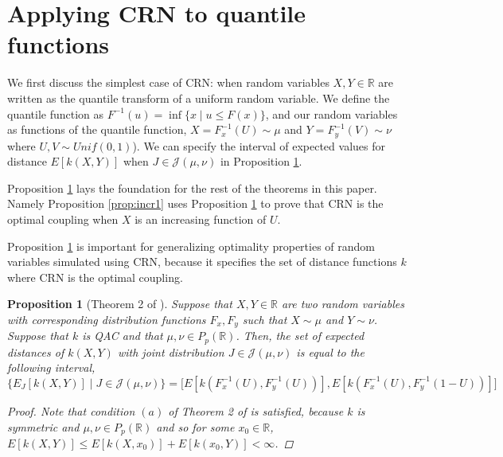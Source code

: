 \documentclass[12pt]{article}
\theoremstyle{plain}%
\newtheorem{prop}[theorem]{Proposition}
\theoremstyle{definition}
\begin{document}
%


\section{Applying CRN to quantile functions}\label{sec:invdf}
We first discuss the simplest case of CRN: when random variables $X,Y\in\mathbb{R}$ are written as the quantile transform of a uniform random variable. We define the quantile function as $F^{-1}(u)=\inf\{x\mid u\leq F(x)\}$, and our random variables as functions of the quantile function, $X=F^{-1}_x(U)\sim\mu$ and $Y=F^{-1}_y(V)\sim\nu$ where $U,V\sim Unif(0,1)$). We can specify the interval of expected values for distance $E[k(X,Y)]$ when $J\in \mathcal{J}(\mu,\nu)$  in Proposition  \ref{prop:interval}.

Proposition \ref{prop:interval} lays the foundation for the rest of the theorems in this paper. Namely Proposition \ref{prop:incr1} uses Proposition \ref{prop:interval} to prove that CRN is the optimal coupling when $X$ is an increasing function of $U$. 

Proposition \ref{prop:interval} is important for generalizing optimality properties of random variables simulated using CRN, because it specifies the set of distance functions $k$ where CRN is the optimal coupling.

\begin{prop}[Theorem 2 of \cite{cambanis1976}]\label{prop:interval}
		Suppose that $X,Y \in \mathbb{R}$ are two random variables with corresponding distribution functions $F_x, F_y$ such that $X\sim \mu$ and $Y\sim \nu$. Suppose that $k$ is QAC and that $\mu,\nu\in P_p(\mathbb{R})$. %
		Then, the set of expected distances of $k(X,Y)$ with joint distribution $J\in \mathcal{J}(\mu,\nu)$ is equal to the following interval,
		$$\big\{E_J[k(X,Y)] \mid J\in \mathcal{J}(\mu,\nu) \big\}= \big[E[k(F^{-1}_x(U),F^{-1}_y(U))], E[k(F^{-1}_x(U),F^{-1}_y(1-U))] \big]$$
		\begin{proof}
		Note that condition $(a)$ of Theorem 2 of \cite{cambanis1976} is satisfied, because $k$ is symmetric and $\mu,\nu\in P_p(\mathbb{R})$ and so for some $x_0\in\mathbb{R}$, $E[k(X,Y)]\leq E[k(X,x_0)]+E[k(x_0,Y)]<\infty$. 	
		\end{proof}	
\end{prop}	
\end{document}
